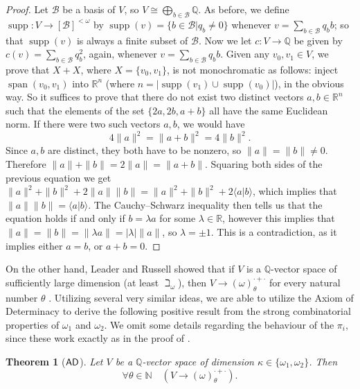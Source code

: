 \documentclass{amsart}
\newtheorem{theorem}{Theorem}[section]
\theoremstyle{definition}
\newcommand{\ad}{\mathnormal{\mathsf{AD}}}
\theoremstyle{remark}
\numberwithin{equation}{section}
\begin{document}
    \begin{proof}
        Let $\mathcal{B}$ be a basis of $V$, so $V\cong\bigoplus_{b\in\mathcal{B}}\mathbb{Q}$. As before, we define $\operatorname{supp}:V\to[\mathcal{B}]^{<\omega}$ by $\operatorname{supp}(v)=\{b\in\mathcal{B}|q_{b}\neq0\}$ whenever $v=\sum_{b\in\mathcal{B}}q_{b}b$; so that $\operatorname{supp}(v)$ is always a finite subset of $\mathcal B$. Now we let $c:V\to\mathbb{Q}$ be given by $c(v)=\sum_{b\in\mathcal{B}}q_{b}^2$, again, whenever $v=\sum_{b\in\mathcal{B}}q_{b}b$.
        Given any $v_{0},v_{1}\in V$, we prove that $X+X$, where $X=\{v_{0},v_{1}\}$, is not monochromatic as follows: inject $\operatorname{span}(v_0,v_1)$ into $\mathbb R^{n}$ (where $n=|\operatorname{supp}(v_1)\cup\operatorname{supp}(v_0)|$), in the obvious way. So it suffices to prove that there do not exist two distinct vectors $a,b\in\mathbb{R}^{n}$ such that the elements of the set $\{2a,2b,a+b\}$ all have the same Euclidean norm. If there were two such vectors $a,b$, we would have
        \begin{equation*}
            4\|a\|^{2}=\|a+b\|^{2}=4\|b\|^{2}.
        \end{equation*}
        Since $a,b$ are distinct, they both have to be nonzero, so $\|a\|=\|b\|\neq0$. Therefore $\|a\|+\|b\|=2\|a\|=\|a+b\|$.
        Squaring both sides of the previous equation we get $\|a\|^{2}+\|b\|^{2}+2\|a\|\|b\|=
        \|a\|^{2}+\|b\|^{2}+2\langle a|b\rangle$, which implies that $\|a\|\|b\|=\langle a|b\rangle$. The Cauchy--Schwarz inequality then tells us that the equation holds if and only if $b=\lambda a$ for some $\lambda\in\mathbb{R}$, however this implies that $\|a\|=\|b\|=\|\lambda a\|=|\lambda|\|a\|$, so $\lambda=\pm1$. This is a contradiction, as it implies either $a=b$, or $a+b=0$.
    \end{proof}

On the other hand, Leader and Russell showed that if $V$ is a $\mathbb{Q}$-vector space of sufficiently large dimension (at least $\beth_\omega$), then $V\to(\omega)^{\cdot+\cdot}_{\theta}$ for every natural number $\theta$ \cite[Theorem 2]{LeaderRussell2020}. 
Utilizing several very similar ideas, we are able to utilize the Axiom of Determinacy to derive the following positive result from the strong combinatorial properties of $\omega_1$ and $\omega_2$. We omit some details regarding the behaviour of the $\pi_i$, since these work exactly as in the proof of \cite[Theorem 2]{LeaderRussell2020}.

\begin{theorem}[$\ad$]\label{thm:owings-omega2}
Let $V$ be a $\mathbb{Q}$-vector space of dimension $\kappa\in\{\omega_1, \omega_2\}$. 
Then
\[
\forall\theta\in\mathbb{N}\quad(V\to(\omega)^{\cdot+\cdot}_{\theta}).
\]
\end{theorem}
\end{document}
